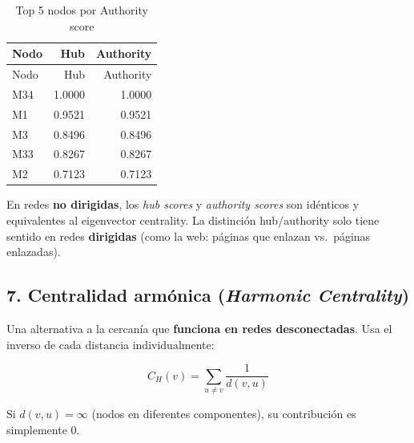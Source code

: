 \documentclass[
  letterpaper,
  DIV=11,
  numbers=noendperiod]{scrreprt}
\begin{document}
\begin{longtable}[]{@{}lrr@{}}
\caption{Top 5 nodos por Authority score}\tabularnewline
\toprule\noalign{}
Nodo & Hub & Authority \\
\midrule\noalign{}
\endfirsthead
\toprule\noalign{}
Nodo & Hub & Authority \\
\midrule\noalign{}
\endhead
\bottomrule\noalign{}
\endlastfoot
M34 & 1.0000 & 1.0000 \\
M1 & 0.9521 & 0.9521 \\
M3 & 0.8496 & 0.8496 \\
M33 & 0.8267 & 0.8267 \\
M2 & 0.7123 & 0.7123 \\
\end{longtable}

\begin{tcolorbox}[enhanced jigsaw, toprule=.15mm, colframe=quarto-callout-warning-color-frame, coltitle=black, titlerule=0mm, colback=white, breakable, leftrule=.75mm, arc=.35mm, bottomtitle=1mm, toptitle=1mm, rightrule=.15mm, bottomrule=.15mm, left=2mm, title=\textcolor{quarto-callout-warning-color}{\faExclamationTriangle}\hspace{0.5em}{⚠️ Error frecuente}, colbacktitle=quarto-callout-warning-color!10!white, opacityback=0, opacitybacktitle=0.6]

En redes \textbf{no dirigidas}, los \emph{hub scores} y \emph{authority
scores} son idénticos y equivalentes al eigenvector centrality. La
distinción hub/authority solo tiene sentido en redes \textbf{dirigidas}
(como la web: páginas que enlazan vs.~páginas enlazadas).

\end{tcolorbox}

\subsection{\texorpdfstring{7. Centralidad armónica (\emph{Harmonic
Centrality})}{7. Centralidad armónica (Harmonic Centrality)}}\label{centralidad-armuxf3nica-harmonic-centrality}

Una alternativa a la cercanía que \textbf{funciona en redes
desconectadas}. Usa el inverso de cada distancia individualmente:

\[
C_H(v) = \sum_{u \neq v} \frac{1}{d(v, u)}
\]

Si \(d(v, u) = \infty\) (nodos en diferentes componentes), su
contribución es simplemente 0.
\end{document}
